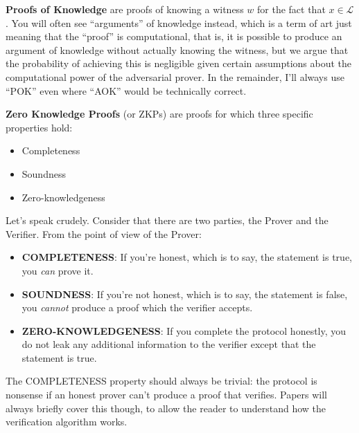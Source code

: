 \documentclass[10pt,a4paper]{article}
\begin{document}
\textbf{Proofs of Knowledge} are proofs of knowing a witness $w$ for the fact that $x \in \mathcal{L}$. You will often see ``arguments'' of knowledge instead, which is a term of art just meaning that the ``proof'' is computational, that is, it is possible to produce an argument of knowledge without actually knowing the witness, but we argue that the probability of achieving this is negligible given certain assumptions about the computational power of the adversarial prover. In the remainder, I'll always use ``POK'' even where ``AOK'' would be technically correct.

\vspace{5 pt}

\textbf{Zero Knowledge Proofs} (or ZKPs) are proofs for which three specific properties hold:

\begin{itemize}
\item Completeness
\item Soundness
\item Zero-knowledgeness
\end{itemize}

Let's speak crudely. Consider that there are two parties, the Prover and the Verifier. From the point of view of the Prover:

\begin{itemize}
\item \textbf{COMPLETENESS}: If you're honest, which is to say, the statement is true, you \emph{can} prove it.

\item \textbf{SOUNDNESS}: If you're not honest, which is to say, the statement is false, you \emph{cannot} produce a proof which the verifier accepts.

\item \textbf{ZERO-KNOWLEDGENESS}: If you complete the protocol honestly, you do not leak any additional information to the verifier except that the statement is true.
\end{itemize}

\vspace{5 pt}

The COMPLETENESS property should always be trivial: the protocol is nonsense if an honest prover can't produce a proof that verifies. Papers will always briefly cover this though, to allow the reader to understand how the verification algorithm works.

\vspace{5 pt}
\end{document}
